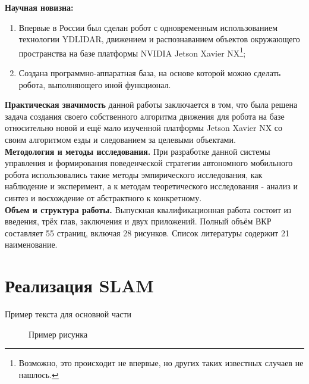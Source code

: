 \documentclass[12pt,a4paper]{scrartcl}
\begin{document}
			\textbf{Научная новизна:}
			\begin{enumerate}
				\item Впервые в России был сделан робот с одновременным использованием технологии YDLIDAR, движением и распознаванием объектов окружающего пространства на базе платформы NVIDIA Jetson Xavier NX\footnote{Возможно, это происходит не впервые, но других таких известных случаев не нашлось.};
				\item Создана программно-аппаратная база, на основе которой можно сделать робота, выполняющего иной функционал.
			\end{enumerate}
			
			\textbf{Практическая значимость} данной работы заключается в том, что была решена задача создания своего собственного алгоритма движения для робота на базе относительно новой и ещё мало изученной платформы Jetson Xavier NX со своим алгоритмом езды и следованием за целевыми объектами. \\ 
			
			\textbf{Методология и методы исследования.} При разработке данной системы управления и формирования поведенческой стратегии автономного мобильного робота использовались такие методы эмпирического исследования, как наблюдение и эксперимент, а к методам теоретического исследования - анализ и синтез и восхождение от абстрактного к конкретному. \\
			
			\textbf{Объем и структура работы.} Выпускная квалификационная работа состоит из введения, трёх глав, заключения и двух приложений. Полный объём ВКР составляет 55 страниц, включая 28 рисунков. Список литературы содержит 21 наименование. \\
			
		\section{Реализация SLAM} \label{sec:slam}
			Пример текста для основной части
			
			\begin{figure}[h]
				\caption{Пример рисунка}
				\label{fig:ROSLogo}
			\end{figure}
		
\end{document}
